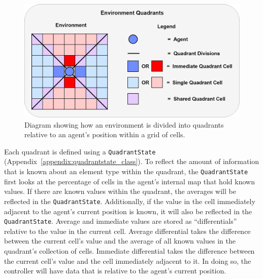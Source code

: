 \begin{figure}[!htb]
  \centering
  \includegraphics[width=1.0\columnwidth]{Figures/quadrants.png}
  \caption[Environment Quadrant Division]{Diagram showing how an environment is divided into quadrants relative to an agent's position within a grid of cells.}
  \label{fig:quadrants}
\end{figure}

Each quadrant is defined using a \texttt{QuadrantState} (Appendix~\ref{appendix:quadrantstate_class}).
To reflect the amount of information that is known about an element type within the quadrant, the \texttt{QuadrantState} first looks at the percentage of cells in the agent's internal map that hold known values.
If there are known values within the quadrant, the averages will be reflected in the \texttt{QuadrantState}.
Additionally, if the value in the cell immediately adjacent to the agent's current position is known, it will also be reflected in the \texttt{QuadrantState}.
Average and immediate values are stored as ``differentials'' relative to the value in the current cell.
Average differential takes the difference between the current cell's value and the average of all known values in the quadrant's collection of cells.
Immediate differential takes the difference between the current cell's value and the cell immediately adjacent to it.
In doing so, the controller will have data that is relative to the agent's current position.


